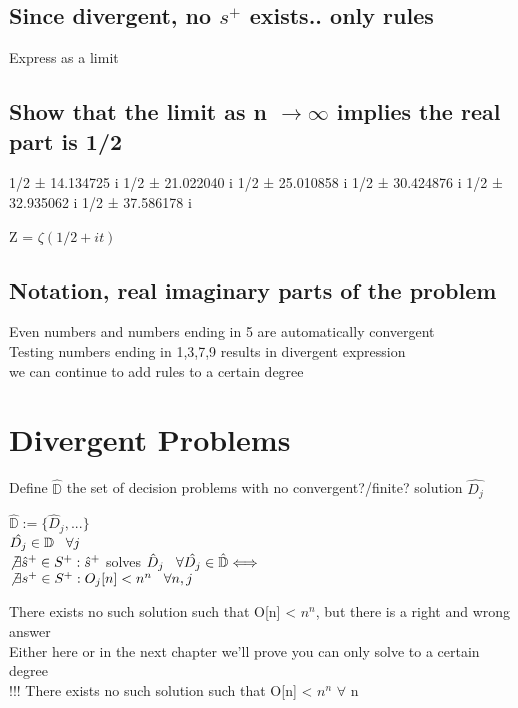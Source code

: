 \documentclass[11pt]{article}
\begin{document}
\subsection{Since divergent, no $s^{+}$ exists.. only rules}
Express as a limit

\subsection{Show that the limit as n $\rightarrow \infty$ implies the real part is 1/2}
1/2 ± 14.134725 i
1/2 ± 21.022040 i
1/2 ± 25.010858 i
1/2 ± 30.424876 i
1/2 ± 32.935062 i
1/2 ± 37.586178 i

Z = $\zeta(1/2 + it)$

\subsection{Notation, real imaginary parts of the problem}
Even numbers and numbers ending in 5 are automatically convergent\\
Testing numbers ending in 1,3,7,9 results in divergent expression\\
we can continue to add rules to a certain degree




















\newpage
\section{Divergent Problems}
Define $\hat{\mathbb{D}}$ the set of decision problems with no convergent?/finite? solution $\hat{D_j}$\\
\begin{center}
$
\hat{\mathbb{D}} := \{\hat{D}_j,...\}
$
\\ \vspace{2mm}
$
\hat{D_j} \in \mathbb{D} \hspace{3mm} \forall j
$
\\ \vspace{2mm}
$
\not \exists \hat{s}^{+} \in S^{+} : \hat{s}^{+}$ solves $\hat{D}_j \hspace{3mm} \forall \hat{D_j} \in \hat{\mathbb{D}} \Longleftrightarrow 
$
\\
$
\not \exists s^{+} \in S^{+} : O_j \lbrack n \rbrack < n^n  \hspace{3mm} \forall n,j
$
\end{center}
There exists no such solution such that O[n] < $n^n$, but there is a right and wrong answer\\
Either here or in the next chapter we'll prove you can only solve to a certain degree\\
 !!! There exists no such solution such that O[n] < $n^n$ \hspace{3mm} $\forall$ n
 
\end{document}
